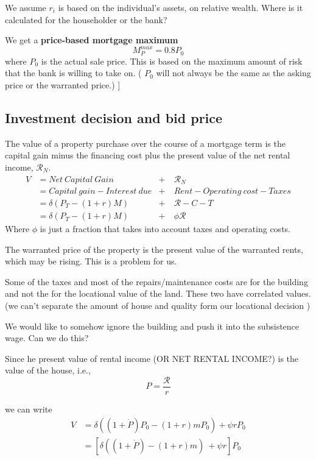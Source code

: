 We assume $r_i$ is based on the individual's assets, on relative wealth. Where is it calculated for the householder or the bank?

We get a \textbf{price-based mortgage maximum} \[M^{max}_P = 0.8P_0\] where $P_0$ is the actual sale price. This is based on the maximum amount of risk that the bank is willing to take on. ( $P_0$  will not always be the same as the asking price or the warranted price.) 
]

\subsection{Investment decision and bid price}
The value of a property purchase over the course of a mortgage term is the capital gain minus the financing cost plus the present value of the net rental income, $\mathcal{R}_N$. 
\begin{align}
V  	&= Net\ Capital\ Gain & +\ & \mathcal{R}_N\\
    &=  Capital\ gain - Interest\ due      &+\ &   Rent  - Operating\ cost - Taxes  \nonumber \\
    &= \delta(P_T- (1+r)M)             	& +\ & \mathcal{R} -C - T \\
    &= \delta(P_T- (1+r)M)             	& +\ & \phi\mathcal{R}\label{eq:Value}
    \end{align}
Where $\phi$ is just a fraction that takes into account taxes and operating costs. 

{\color{red}
 The warranted price of the property is the present value of the warranted rents, which may be rising. This is a problem for  us.

Some of the taxes and most of the repairs/maintenance costs are for the building and not the for the locational value of the land. These two have correlated values. (we can't separate the amount of house and quality form our locational decision ) 

We would like to  somehow ignore the building and push it into the subsistence wage. Can we do this?
}

Since he present value of rental income (OR NET RENTAL INCOME?) is the value of the house, i.e., 
\begin{equation}
  P=\frac{\mathcal{R}}{r}  \label{eq:Capitalization}
\end{equation}





\noindent we can write
\begin{align}  
    V & = \delta((1+\dot P)  P_0- (1+r)mP_0)  + \psi rP_0  \\
    & =\left[ \delta ((1+\dot P)  - (1+r)m)\  + \psi r\right]P_0
\end{align}


